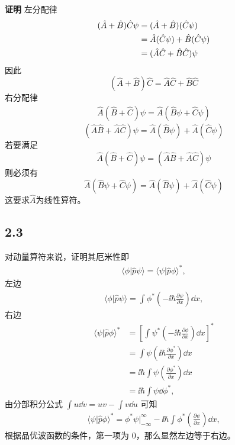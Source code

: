 \textbf{证明} \quad 左分配律
\begin{align}
(\hat A + \hat B) \hat C \psi &= (\hat A + \hat B) (\hat C \psi) \notag\\
&= \hat A (\hat C \psi) + \hat B (\hat C \psi) \notag\\
&= (\hat A\hat C + \hat B \hat C) \psi
\end{align}
因此
\begin{equation}
(\hat A + \hat B) \hat C = \hat A \hat C + \hat B \hat C
\end{equation}
右分配律
\begin{align}
\hat A (\hat B + \hat C) \psi = \hat A (\hat B \psi + \hat C \psi)
\end{align}
\begin{equation}
(\hat A \hat B + \hat A \hat C) \psi = \hat A (\hat B \psi) + \hat A (\hat C \psi)
\end{equation}
若要满足
\begin{equation}
\hat A (\hat B + \hat C) \psi = (\hat A \hat B + \hat A \hat C) \psi
\end{equation}
则必须有
\begin{equation}
\hat A (\hat B \psi + \hat C \psi) = \hat A (\hat B \psi) + \hat A (\hat C \psi)
\end{equation}
这要求$ \hat A $为线性算符。

\subsection{2.3}
对动量算符来说，证明其厄米性即
\begin{align}
    \langle{\phi|\hat{p}\psi}\rangle=\langle{\psi|\hat{p}\phi}\rangle^*,
\end{align}
左边
\begin{align}
    \langle{\phi|\hat{p}\psi}\rangle=\int{\phi^*\left(-\ii\hbar \frac{\partial\psi}{\partial x}\right)\dd x},
\end{align}
右边
\begin{align}
    \langle{\psi|\hat{p}\phi}\rangle^*&=\left[\int{\psi^*\left(-\ii\hbar \frac{\partial\phi}{\partial x}\right)\dd x}\right]^* \\
&=\int{\psi\left(\ii\hbar \frac{\partial\phi^*}{\partial x}\right)\dd x}\\
&=\ii\hbar \int{\psi\left(\frac{\partial\phi^*}{\partial x}\right)\dd x}\\
&=\ii\hbar \int \psi \dd\phi^*,
\end{align}
由分部积分公式 $\int u\dd v = uv - \int v\dd u$ 可知
\begin{align}
    \langle{\psi|\hat{p}\phi}\rangle^*=\phi^*\psi|_{-\infty}^{\infty}-\ii\hbar \int{\phi^*\left(\frac{\partial\psi}{\partial x}\right)\dd x},
\end{align}
根据品优波函数的条件，第一项为 0，那么显然左边等于右边。

